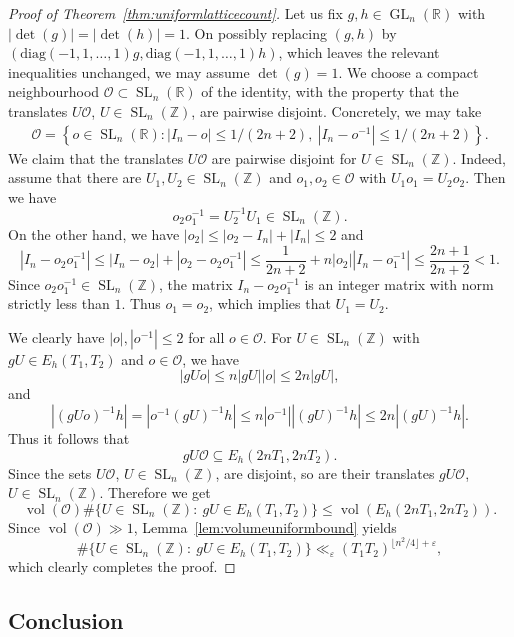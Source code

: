 \documentclass[11pt,reqno]{amsart}
\theoremstyle{definition}
\theoremstyle{remark}
\newcommand{\vol}{\operatorname{vol}}
\newcommand{\GL}{\operatorname{GL}}
\newcommand{\SL}{\operatorname{SL}}
\numberwithin{equation}{section}
\numberwithin{thm}{section}
\numberwithin{table}{section}
\def \R {{\mathbb R}}
\def \Z {{\mathbb Z}}
\begin{document}
\begin{proof}[Proof of Theorem~\ref{thm:uniformlatticecount}]
    Let us fix $g,h \in \GL_n(\R)$ with $|\det(g)|=|\det(h)|=1$. On possibly replacing $(g,h)$ by $ (\mathrm{diag}(-1,1,\ldots,1)g,  \mathrm{diag}(-1,1,\ldots,1)h) $, which leaves the relevant inequalities unchanged, we may assume $\det(g)=1$.
   We  choose a compact neighbourhood  $\mathcal{O} \subset \SL_n(\R)$ of the identity,
    with the property that the  translates $U \mathcal{O}$, $U \in \SL_n(\Z)$, are pairwise disjoint.  Concretely, we may take
\begin{align*}
    \mathcal{O} = 
    \left\{ 
    o \in \SL_n(\R):
    | 
    I_n - o
    | \le 1/(2n+2), \ 
    | 
    I_n - o^{-1}
    | \le 1/(2n+2)
    \right\}.
\end{align*}
We claim that  the translates 
$U \mathcal{O}$ are pairwise disjoint
for $U \in \SL_n(\Z)$.
Indeed, 
assume that there are 
$U_1, U_2 \in \SL_n(\Z)$ and $o_1, o_2 \in \mathcal{O}$ with $U_1 o_1 = U_2 o_2$. Then we have 
\[
   o_2 o_1^{-1} =  U_2^{-1} U_1 \in \SL_n(\Z).
\]
On the other hand, we have  $|o_2|\le |o_2 - I_n|+|I_n| \le 2$ and
\[
    |I_n - o_2 o_1^{-1}| \le |I_n - o_2| + |o_2 - o_2 o_1^{-1}| \le \frac{1}{2n+2} + n|o_2||I_n -o_1^{-1}| \le \frac{2n+1}{2n+2} < 1.
\]
Since $o_2 o_1^{-1} \in \SL_n(\Z)$, the matrix $I_n - o_2o_1^{-1}$ is an integer matrix with 
 norm  strictly less than $1$. Thus  $o_1 = o_2$, which implies that  $U_1 = U_2$. 

We clearly have  $|o|,|o^{-1}| \le 2$ for all $o \in \mathcal{O}$. For $U \in \SL_n(\Z)$ with $gU \in E_h(T_1, T_2)$ and $o \in \mathcal{O}$, we have  
\[
    |gUo| \le n |gU||o| \le 2n|gU|, 
\]
and 
\[
    |(gUo)^{-1}h| = |o^{-1}(gU)^{-1}h| \le n |o^{-1}||(gU)^{-1}h| \le2 n |(gU)^{-1}h|.
\]
Thus  it follows that 
\[
    gU \mathcal{O} \subseteq E_{h}(2nT_1, 2nT_2).
\]
Since the sets $U \mathcal{O}$, $U \in \SL_n(\Z)$, are disjoint, so are their translates $gU \mathcal{O}$, $U \in \SL_n(\Z)$. 
Therefore we get 
\[
    \vol(\mathcal{O}) \#\{ U \in \SL_n(\Z):~ gU \in E_{h}(T_1,T_2)\} \le \vol(E_{h}(2nT_1,2nT_2)). 
\]
Since $\vol(\mathcal{O})\gg 1$, Lemma~\ref{lem:volumeuniformbound} yields  
\[
    \#\{ U \in \SL_n(\Z):~ gU \in E_{h}(T_1,T_2)\} \ll_{\varepsilon} (T_1 T_2)^{\lfloor n^2/4 \rfloor+\varepsilon} ,
\]
which clearly completes the proof.
\end{proof}


\subsection{Conclusion} \label{section:uniform_proof}
\end{document}

